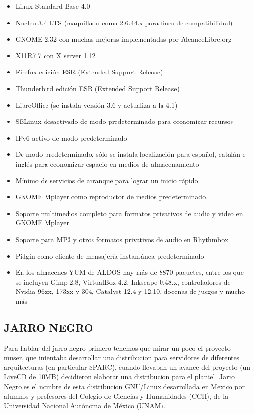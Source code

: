 \begin{itemize}
  \item Linux Standard Base 4.0
  \item Núcleo 3.4 LTS (maquillado como 2.6.44.x para fines de
	compatibilidad)
  \item GNOME 2.32 con muchas mejoras implementadas por
	AlcanceLibre.org
  \item X11R7.7 con X server 1.12
  \item Firefox edición ESR (Extended Support Release)
  \item Thunderbird edición ESR (Extended Support Release)
  \item LibreOffice (se instala versión 3.6 y actualiza a la 4.1)
  \item SELinux desactivado de modo predeterminado para
	economizar recursos
  \item IPv6 activo de modo predeterminado
  \item De modo predeterminado, sólo se instala localización para
	español, catalán e inglés para economizar espacio en
	medios de almacenamiento
  \item Mínimo de servicios de arranque para lograr un inicio
	rápido
  \item GNOME Mplayer como reproductor de medios
	predeterminado
  \item Soporte multimedios completo para formatos privativos
	de audio y video en GNOME Mplayer
  \item Soporte para MP3 y otros formatos privativos de audio en
	Rhythmbox
  \item Pidgin como cliente de mensajería instantánea
	predeterminado
  \item En los almacenes YUM de ALDOS hay más de 8870
	paquetes, entre los que se incluyen Gimp 2.8, VirtualBox
	4.2, Inkscape 0.48.x, controladores de Nvidia 96xx, 173xx
	y 304, Catalyst 12.4 y 12.10, docenas de juegos y mucho
	más
\end{itemize}

\subsection*{JARRO NEGRO}
Para hablar del jarro negro primero tenemos que mirar un poco
el proyecto muser, que intentaba desarrollar una distribucion
para servidores de diferentes arquitecturas (en particular
SPARC). cuando llevaban un avance del proyecto (un LiveCD de
10MB) decidieron elaborar una distribucion para el plantel.
Jarro Negro es el nombre de esta distribucion GNU/Linux
desarrollada en Mexico por alumnos y profesores del Colegio de
Ciencias y Humanidades (CCH), de la Universidad Nacional
Autónoma de México (UNAM).

